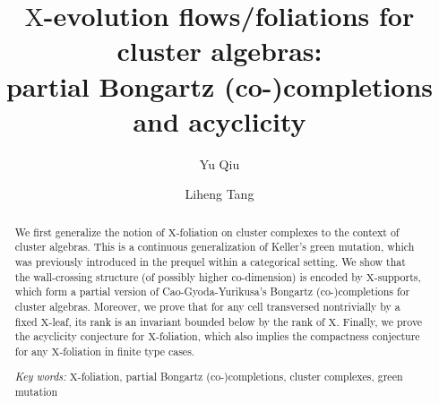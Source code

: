 \documentclass[11pt,reqno]{amsart}
\title[$\mathrm{X}$-evolution flows/foliations: supports and orders]
{$\mathrm{X}$-evolution flows/foliations for cluster algebras:\\
partial Bongartz (co-)completions and acyclicity}
\author{Yu Qiu}
\author{Liheng Tang}
\theoremstyle{plain}
\theoremstyle{definition}
\numberwithin{equation}{section}
\newcommand\<{\langle}
\renewcommand\>{\rangle}
\def\sink{X}
\newcommand{\ccpt}[1]{\mathrm{#1}}%
\def\xevo{\ccpt{X}}%
\begin{document}
\def\EVO{evo }
\begin{abstract}

We first generalize the notion of $\xevo$-foliation on cluster complexes to the context of cluster algebras.
This is a continuous generalization of Keller's green mutation, which was previously introduced in the prequel within a categorical setting.
We show that the wall-crossing structure (of possibly higher co-dimension) is encoded by $\xevo$-supports, which form a partial version of Cao-Gyoda-Yurikusa's Bongartz (co-)completions for cluster algebras.
Moreover, we prove that for any cell transversed nontrivially by a fixed $\xevo$-leaf, its rank is an invariant bounded below by the rank of $\xevo$.
Finally, we prove the acyclicity conjecture for $\xevo$-foliation, which also implies the compactness conjecture for any $\xevo$-foliation in finite type cases.




\bigskip\noindent
\emph{Key words:}
$\xevo$-foliation, partial Bongartz (co-)completions, cluster complexes, green mutation%
\end{abstract}
\maketitle

\tableofcontents

\setlength\parindent{0pt}
\setlength{\parskip}{5pt}
\setlength{\emergencystretch}{2em}

\end{document}
